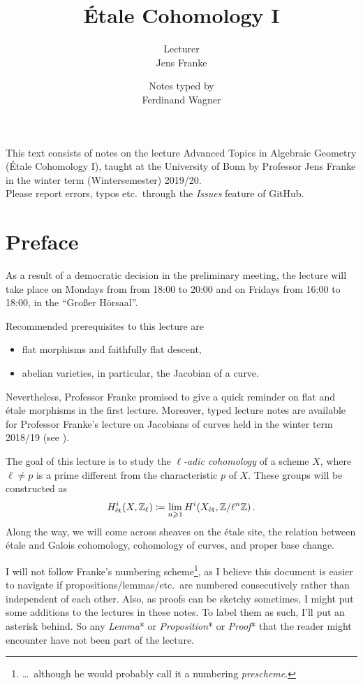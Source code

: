 \documentclass[a4paper, 10pt, oneside, DIV=9, chapterprefix=true, numbers=enddot]{scrbook}
\title{Étale Cohomology I}
\author{{\normalsize Lecturer}\\
	Jens Franke}
\date{{\normalsize Notes typed by}\\
	Ferdinand Wagner}
\begin{document}
	\frontmatter
	\maketitle
	\noindent This text consists of notes on the lecture Advanced Topics in Algebraic Geometry (Étale Cohomology I), taught at the University of
	Bonn by Professor Jens Franke in the winter term (Wintersemester) 2019/20.\\[\thmsep]Please report errors, typos etc.\ through the \emph{Issues} feature of GitHub.
	
	
	\tableofcontents
	\chapter{Preface}
	As a result of a democratic decision in the preliminary meeting, the lecture will take place on Mondays from from 18:00 to 20:00 and on Fridays from 16:00 to 18:00, in the \enquote{Großer Hörsaal}.
	
	Recommended prerequisites to this lecture are
	\begin{itemize}
		\item flat morphisms and faithfully flat descent,
		\item abelian varieties, in particular, the Jacobian of a curve.
	\end{itemize}
	Nevertheless, Professor Franke promised to give a quick reminder on flat and étale morphisms in the first lecture. Moreover, typed lecture notes are available for Professor Franke's lecture on Jacobians of curves held in the winter term 2018/19 (see \cite{jacobians}). 
	
	The goal of this lecture is to study the \emph{$\ell$-adic cohomology} of a scheme $X$, where $\ell\neq p$ is a prime different from the characteristic $p$ of $X$. These groups will be constructed as
	\begin{align*}
		H_{\mathrm{\acute{e}t}}^i(X,\mathbb{Z}_\ell)\coloneqq\lim_{n\geqslant 1}H^i(X_{\mathrm{\acute{e}t}},\mathbb{Z}/\ell^n\mathbb{Z})\,.
	\end{align*}
	Along the way, we will come across sheaves on the étale site, the relation between étale and Galois cohomology, cohomology of curves, and proper base change.
	
	I will not follow Franke's numbering scheme\footnote{\ldots\ although he would probably call it a numbering \emph{prescheme}.}, as I believe this document is easier to navigate if propositions/lemmas/etc.\ are numbered consecutively rather than independent of each other. Also, as proofs can be sketchy sometimes, I might put some additions to the lectures in these notes. To label them as such, I'll put an asterisk behind. So any \emph{Lemma}* or \emph{Proposition}* or \emph{Proof}* that the reader might encounter have not been part of the lecture.
	
\end{document}
